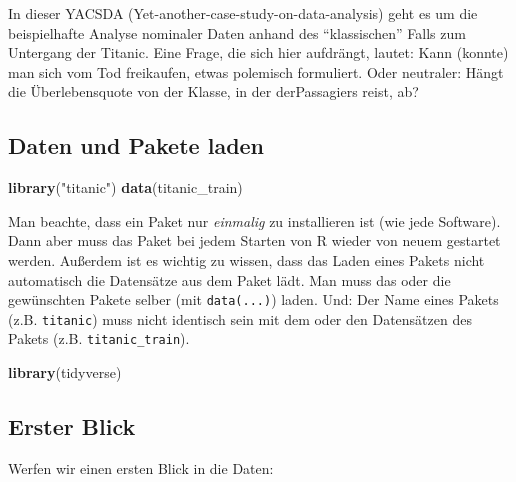 \documentclass[12pt,ngerman,]{book}
\newenvironment{Shaded}{\begin{snugshade}}{\end{snugshade}}
\newcommand{\KeywordTok}[1]{\textcolor[rgb]{0.13,0.29,0.53}{\textbf{{#1}}}}
\newcommand{\StringTok}[1]{\textcolor[rgb]{0.31,0.60,0.02}{{#1}}}
\newcommand{\NormalTok}[1]{{#1}}
\renewenvironment{Shaded}{\begin{kframe}}{\end{kframe}}
\begin{document}
In dieser YACSDA (Yet-another-case-study-on-data-analysis) geht es um
die beispielhafte Analyse nominaler Daten anhand des ``klassischen''
Falls zum Untergang der Titanic. Eine Frage, die sich hier aufdrängt,
lautet: Kann (konnte) man sich vom Tod freikaufen, etwas polemisch
formuliert. Oder neutraler: Hängt die Überlebensquote von der Klasse, in
der derPassagiers reist, ab?

\subsection{Daten und Pakete laden}\label{daten-und-pakete-laden}

\begin{Shaded}
\begin{Highlighting}[]
\KeywordTok{library}\NormalTok{(}\StringTok{"titanic"}\NormalTok{)}
\KeywordTok{data}\NormalTok{(titanic_train)}
\end{Highlighting}
\end{Shaded}

Man beachte, dass ein Paket nur \emph{einmalig} zu installieren ist (wie
jede Software). Dann aber muss das Paket bei jedem Starten von R wieder
von neuem gestartet werden. Außerdem ist es wichtig zu wissen, dass das
Laden eines Pakets nicht automatisch die Datensätze aus dem Paket lädt.
Man muss das oder die gewünschten Pakete selber (mit \texttt{data(...)})
laden. Und: Der Name eines Pakets (z.B. \texttt{titanic}) muss nicht
identisch sein mit dem oder den Datensätzen des Pakets (z.B.
\texttt{titanic\_train}).

\begin{Shaded}
\begin{Highlighting}[]
\KeywordTok{library}\NormalTok{(tidyverse)}
\end{Highlighting}
\end{Shaded}

\subsection{Erster Blick}\label{erster-blick}

Werfen wir einen ersten Blick in die Daten:
\end{document}

